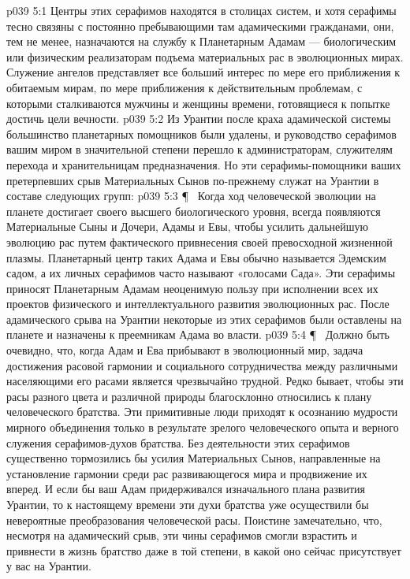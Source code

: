 \vs p039 5:1 Центры этих серафимов находятся в столицах систем, и хотя серафимы тесно связяны с постоянно пребывающими там адамическими гражданами, они, тем не менее, назначаются на службу к Планетарным Адамам --- биологическим или физическим реализаторам подъема материальных рас в эволюционных мирах. Служение ангелов представляет все больший интерес по мере его приближения к обитаемым мирам, по мере приближения к действительным проблемам, с которыми сталкиваются мужчины и женщины времени, готовящиеся к попытке достичь цели вечности.
\vs p039 5:2 Из Урантии после краха адамической системы большинство планетарных помощников были удалены, и руководство серафимов вашим миром в значительной степени перешло к администраторам, служителям перехода и хранительницам предназначения. Но эти серафимы\hyp{}помощники ваших претерпевших срыв Материальных Сынов по\hyp{}прежнему служат на Урантии в составе следующих групп:
\vs p039 5:3 \P\ \bibnobreakspace {} Когда ход человеческой эволюции на планете достигает своего высшего биологического уровня, всегда появляются Материальные Сыны и Дочери, Адамы и Евы, чтобы усилить дальнейшую эволюцию рас путем фактического привнесения своей превосходной жизненной плазмы. Планетарный центр таких Адама и Евы обычно называется Эдемским садом, а их личных серафимов часто называют «голосами Сада». Эти серафимы приносят Планетарным Адамам неоценимую пользу при исполнении всех их проектов физического и интеллектуального развития эволюционных рас. После адамического срыва на Урантии некоторые из этих серафимов были оставлены на планете и назначены к преемникам Адама во власти.
\vs p039 5:4 \P\ \bibnobreakspace {} Должно быть очевидно, что, когда Адам и Ева прибывают в эволюционный мир, задача достижения расовой гармонии и социального сотрудничества между различными населяющими его расами является чрезвычайно трудной. Редко бывает, чтобы эти расы разного цвета и различной природы благосклонно относились к плану человеческого братства. Эти примитивные люди приходят к осознанию мудрости мирного объединения только в результате зрелого человеческого опыта и верного служения серафимов\hyp{}духов братства. Без деятельности этих серафимов существенно тормозились бы усилия Материальных Сынов, направленные на установление гармонии среди рас развивающегося мира и продвижение их вперед. И если бы ваш Адам придерживался изначального плана развития Урантии, то к настоящему времени эти духи братства уже осуществили бы невероятные преобразования человеческой расы. Поистине замечательно, что, несмотря на адамический срыв, эти чины серафимов смогли взрастить и привнести в жизнь братство даже в той степени, в какой оно сейчас присутствует у вас на Урантии.
